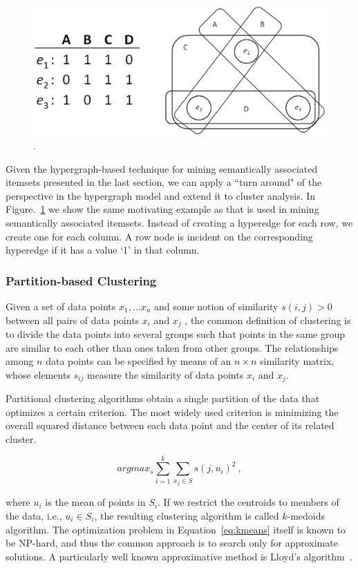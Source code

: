 \begin{figure}[tbh]
\centering
\includegraphics[width=.6\textwidth]{fig/hypergraph-column-wise.eps}
\caption{\label{fig:hypergraph-column-wise} .}
\end{figure}
Given the hypergraph-based technique for mining semantically associated itemsets presented in the last section, we can apply a ``turn around" of the perspective in the hypergraph model and extend it to cluster analysis. In Figure.~\ref{fig:hypergraph-column-wise} we show the same motivating example as that is used in mining semantically associated itemsets. Instead of creating a hyperedge for each row, we create one for each column. A row node is incident on the corresponding hyperedge if it has a value `1' in that column.

\subsubsection{Partition-based Clustering}
Given a set of data points $x_1, \ldots x_n$ and some notion of similarity $s(i,j) > 0$ between all pairs of data points $x_i$ and $x_j$ , the common definition of clustering is to divide the data points into several groups such that points in the same group are similar to each other than ones taken from other groups. The relationships among $n$ data points can be specified by means of an $n \times n$ similarity matrix, whose elements $s_{ij}$ measure the similarity of data points $x_i$ and $x_j$.

Partitional clustering algorithms obtain a single partition of the data that optimizes a certain criterion. The most widely used criterion is minimizing the overall squared distance between each data point and the center of its related cluster.

\begin{equation}
argmax_s\sum^k_{i=1}\sum_{x_j\in S}s(j,u_i)^2~, \label{eq:kmeans}
\end{equation}

where $u_i$ is the mean of points in $S_i$. If we restrict the centroids to members of the data, i.e., $u_i \in S_i$, the resulting clustering algorithm is called $k$-medoids algorithm. The optimization problem in Equation~\ref{eq:kmeans} itself is known to be NP-hard, and thus the common approach is to search only for approximate solutions. A particularly well known approximative method is Lloyd's algorithm~\cite{Lloyd83}.


